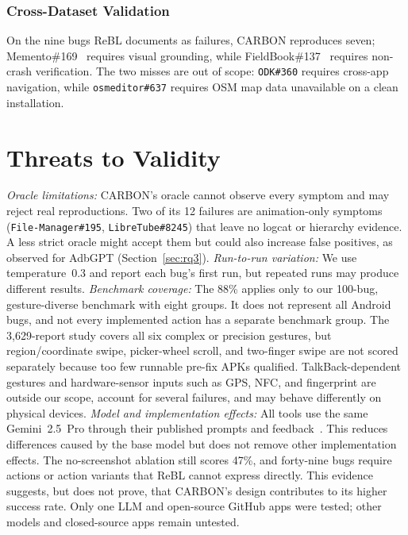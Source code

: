 \documentclass[10pt,conference,a4paper]{IEEEtran}
\begin{document}
  \subsubsection{Cross-Dataset Validation}
  On the nine bugs ReBL documents as failures, CARBON reproduces seven;
  Memento\#169~\cite{memento169} requires visual grounding, while
  FieldBook\#137~\cite{fieldbook137} requires non-crash verification. The two
  misses are out of scope: \texttt{ODK\#360} requires cross-app navigation,
  while \texttt{osmeditor\#637} requires OSM map data unavailable on a clean
  installation.

  \section{Threats to Validity}
  \label{sec:threats}
  \emph{Oracle limitations:} CARBON's oracle cannot observe every symptom
  and may reject real reproductions. Two of its 12 failures are
  animation-only symptoms (\texttt{File-Manager\#195},
  \texttt{LibreTube\#8245}) that leave no logcat or hierarchy evidence. A less
  strict oracle might accept them but could also increase false positives,
  as observed for AdbGPT (Section~\ref{sec:rq3}). \emph{Run-to-run
  variation:} We use temperature~0.3 and report each bug's first run, but
  repeated runs may produce different results. \emph{Benchmark coverage:} The 88\% applies only to our 100-bug,
  gesture-diverse benchmark with eight groups. It does not represent all
  Android bugs, and not every implemented action has a separate benchmark
  group. The 3{,}629-report study
  covers all six complex or precision gestures, but region/coordinate
  swipe, picker-wheel scroll, and two-finger swipe are not scored
  separately because too few runnable pre-fix APKs qualified. TalkBack-dependent
  gestures and hardware-sensor inputs such as GPS, NFC, and
  fingerprint are outside our scope, account for several failures, and may
  behave differently on physical devices. \emph{Model and implementation
  effects:} All tools use the same Gemini~2.5~Pro through their published
  prompts and feedback~\cite{rebl,adbgpt,reactdroid}. This reduces
  differences caused by the base model but does not remove other
  implementation effects. The no-screenshot ablation still scores 47\%,
  and forty-nine bugs require actions or action variants that ReBL cannot
  express directly.
  This evidence suggests, but does not prove, that CARBON's design
  contributes to its higher success rate. Only one LLM and open-source
  GitHub apps were tested; other models and closed-source apps remain
  untested.
\end{document}
